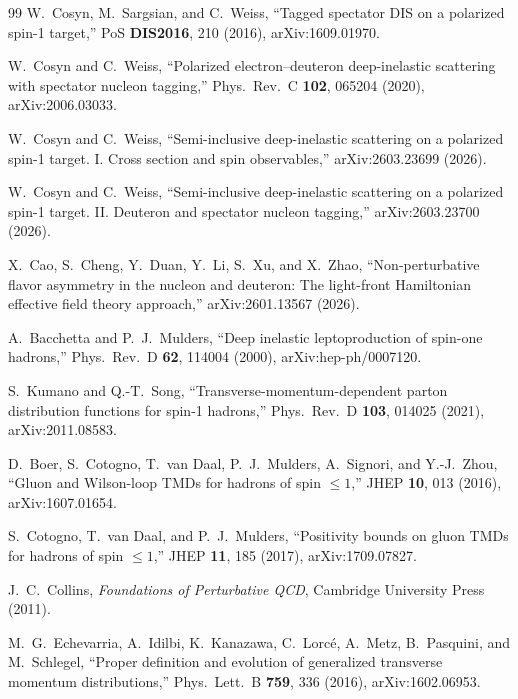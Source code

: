\documentclass[11pt]{article}
\begin{document}
\begin{thebibliography}{99}
W.~Cosyn, M.~Sargsian, and C.~Weiss,
``Tagged spectator DIS on a polarized spin-1 target,''
PoS \textbf{DIS2016}, 210 (2016), arXiv:1609.01970.

W.~Cosyn and C.~Weiss,
``Polarized electron--deuteron deep-inelastic scattering with spectator
nucleon tagging,''
Phys.\ Rev.\ C \textbf{102}, 065204 (2020), arXiv:2006.03033.

W.~Cosyn and C.~Weiss,
``Semi-inclusive deep-inelastic scattering on a polarized spin-1 target. I.
Cross section and spin observables,''
arXiv:2603.23699 (2026).

W.~Cosyn and C.~Weiss,
``Semi-inclusive deep-inelastic scattering on a polarized spin-1 target. II.
Deuteron and spectator nucleon tagging,''
arXiv:2603.23700 (2026).

X.~Cao, S.~Cheng, Y.~Duan, Y.~Li, S.~Xu, and X.~Zhao,
``Non-perturbative flavor asymmetry in the nucleon and deuteron: The
light-front Hamiltonian effective field theory approach,''
arXiv:2601.13567 (2026).

A.~Bacchetta and P.~J.~Mulders,
``Deep inelastic leptoproduction of spin-one hadrons,''
Phys.\ Rev.\ D \textbf{62}, 114004 (2000), arXiv:hep-ph/0007120.

S.~Kumano and Q.-T.~Song,
``Transverse-momentum-dependent parton distribution functions for spin-1
hadrons,''
Phys.\ Rev.\ D \textbf{103}, 014025 (2021), arXiv:2011.08583.

D.~Boer, S.~Cotogno, T.~van Daal, P.~J.~Mulders, A.~Signori, and Y.-J.~Zhou,
``Gluon and Wilson-loop TMDs for hadrons of spin \(\leq1\),''
JHEP \textbf{10}, 013 (2016), arXiv:1607.01654.

S.~Cotogno, T.~van Daal, and P.~J.~Mulders,
``Positivity bounds on gluon TMDs for hadrons of spin \(\leq1\),''
JHEP \textbf{11}, 185 (2017), arXiv:1709.07827.

J.~C.~Collins,
\emph{Foundations of Perturbative QCD},
Cambridge University Press (2011).

M.~G.~Echevarria, A.~Idilbi, K.~Kanazawa, C.~Lorc\'e, A.~Metz,
B.~Pasquini, and M.~Schlegel,
``Proper definition and evolution of generalized transverse momentum
distributions,''
Phys.\ Lett.\ B \textbf{759}, 336 (2016), arXiv:1602.06953.

\end{thebibliography}
\end{document}
